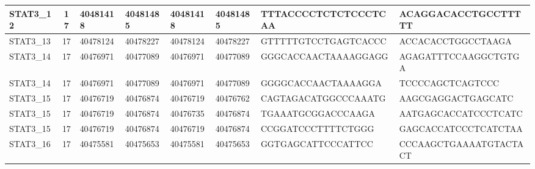 \begin{landscape}
\begin{longtable}{| p{} | p{} | p{} | p{} | p{} | p{} | p{} | p{} |}
\multicolumn{1}{|l|}{STAT3\_12}  & \multicolumn{1}{c|}{17} & \multicolumn{1}{l|}{40481418}  & \multicolumn{1}{l|}{40481485}  & \multicolumn{1}{l|}{40481418}  & \multicolumn{1}{l|}{40481485}  & \multicolumn{1}{l|}{TTTACCCCTCTCTCCCTCAA}            & \multicolumn{1}{l|}{ACAGGACACCTGCCTTTTT}           \\ \hline
\multicolumn{1}{|l|}{STAT3\_13}  & \multicolumn{1}{c|}{17} & \multicolumn{1}{l|}{40478124}  & \multicolumn{1}{l|}{40478227}  & \multicolumn{1}{l|}{40478124}  & \multicolumn{1}{l|}{40478227}  & \multicolumn{1}{l|}{GTTTTTGTCCTGAGTCACCC}            & \multicolumn{1}{l|}{ACCACACCTGGCCTAAGA}            \\ \hline
\multicolumn{1}{|l|}{STAT3\_14}  & \multicolumn{1}{c|}{17} & \multicolumn{1}{l|}{40476971}  & \multicolumn{1}{l|}{40477089}  & \multicolumn{1}{l|}{40476971}  & \multicolumn{1}{l|}{40477089}  & \multicolumn{1}{l|}{GGGCACCAACTAAAAGGAGG}            & \multicolumn{1}{l|}{AGAGATTTCCAAGGCTGTGA}          \\ \hline
\multicolumn{1}{|l|}{STAT3\_14}  & \multicolumn{1}{c|}{17} & \multicolumn{1}{l|}{40476971}  & \multicolumn{1}{l|}{40477089}  & \multicolumn{1}{l|}{40476971}  & \multicolumn{1}{l|}{40477089}  & \multicolumn{1}{l|}{GGGGCACCAACTAAAAGGA}             & \multicolumn{1}{l|}{TCCCCAGCTCAGTCCC}              \\ \hline
\multicolumn{1}{|l|}{STAT3\_15}  & \multicolumn{1}{c|}{17} & \multicolumn{1}{l|}{40476719}  & \multicolumn{1}{l|}{40476874}  & \multicolumn{1}{l|}{40476719}  & \multicolumn{1}{l|}{40476762}  & \multicolumn{1}{l|}{CAGTAGACATGGCCCAAATG}            & \multicolumn{1}{l|}{AAGCGAGGACTGAGCATC}            \\ \hline
\multicolumn{1}{|l|}{STAT3\_15}  & \multicolumn{1}{c|}{17} & \multicolumn{1}{l|}{40476719}  & \multicolumn{1}{l|}{40476874}  & \multicolumn{1}{l|}{40476735}  & \multicolumn{1}{l|}{40476874}  & \multicolumn{1}{l|}{TGAAATGCGGACCCAAGA}              & \multicolumn{1}{l|}{AATGAGCACCATCCCTCATC}          \\ \hline
\multicolumn{1}{|l|}{STAT3\_15}  & \multicolumn{1}{c|}{17} & \multicolumn{1}{l|}{40476719}  & \multicolumn{1}{l|}{40476874}  & \multicolumn{1}{l|}{40476719}  & \multicolumn{1}{l|}{40476874}  & \multicolumn{1}{l|}{CCGGATCCCTTTTCTGGG}              & \multicolumn{1}{l|}{GAGCACCATCCCTCATCTAA}          \\ \hline
\multicolumn{1}{|l|}{STAT3\_16}  & \multicolumn{1}{c|}{17} & \multicolumn{1}{l|}{40475581}  & \multicolumn{1}{l|}{40475653}  & \multicolumn{1}{l|}{40475581}  & \multicolumn{1}{l|}{40475653}  & \multicolumn{1}{l|}{GGTGAGCATTCCCATTCC}              & \multicolumn{1}{l|}{CCCAAGCTGAAAATGTACTACT}        \\ \hline

\end{longtable}
\end{landscape}
